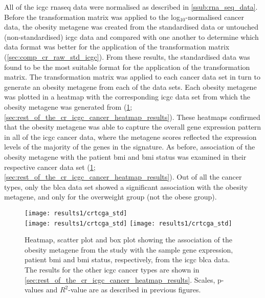 All of the \gls{icgc} \gls{rnaseq} data were normalised as described in \cref{ssub:rna_seq_data}.
Before the transformation matrix was applied to the log$_{10}$-normalised cancer data, the obesity metagene was created from the standardised data or untouched (non-standardised) \gls{icgc} data and compared with one another to determine which data format was better for the application of the transformation matrix (\cref{sec:comp_cr_raw_std_icgc}).
From these results, the standardised data was found to be the most suitable format for the application  of the transformation matrix.
The transformation matrix was applied to each cancer data set in turn to generate an obesity metagene from each of the data sets.
Each obesity metagene was plotted in a heatmap with the corresponding \gls{icgc} data set from which the obesity metagene was generated from (\cref{fig:crmetaicgc}; \cref{sec:rest_of_the_cr_icgc_cancer_heatmap_results}).
These heatmaps confirmed that the obesity metagene was able to capture the overall gene expression pattern in all of the \gls{icgc} cancer data, where the metagene scores reflected the expression levels of the majority of the genes in the signature.
As before, association of the obesity metagene with the patient \gls{bmi} and \gls{bmi} status was examined in their respective cancer data set (\cref{fig:crmetaicgc}; \cref{sec:rest_of_the_cr_icgc_cancer_heatmap_results}).
Out of all the cancer types, only the \gls{blca} data set showed a significant association with the obesity metagene,  and only for the overweight group (not the obese group).

\begin{figure}[htp!]
	\centering
	\texttt{[image: results1/crtcga\_std]}\\
	\texttt{[image: results1/crtcga\_std]}
	\hfill
	\texttt{[image: results1/crtcga\_std]}
	\caption[Obesity metagene from the \citet{Creighton2012} study in the \acrshort{icgc} \acrshort{blca} data]{Heatmap, scatter plot and box plot showing the association of the obesity metagene from the \citet{Creighton2012} study with the sample gene expression, patient \gls{bmi} and \gls{bmi} status, respectively, from the \gls{icgc} \gls{blca} data.
	The results for the other \gls{icgc} cancer types are shown in \cref{sec:rest_of_the_cr_icgc_cancer_heatmap_results}.
	Scales, p-values and $R^2$-value are as described in previous figures.}
	\label{fig:crmetaicgc}
\end{figure}

